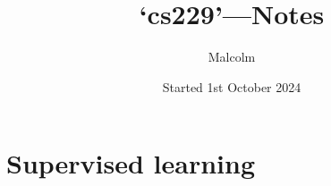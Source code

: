 \documentclass{report}
\title{`cs229'---Notes}
\date{Started 1st October 2024}
\author{Malcolm}
\begin{document}
\maketitle

\chapter{Supervised learning}
\section{}
\end{document}
